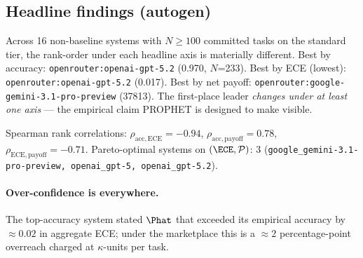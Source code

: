 \subsection*{Headline findings (autogen)}
Across 16 non-baseline systems with $N \ge 100$ committed tasks on the standard tier, the rank-order under each headline axis is materially different. Best by accuracy: \texttt{openrouter:openai-gpt-5.2} (0.970, $N$=233). Best by ECE (lowest): \texttt{openrouter:openai-gpt-5.2} (0.017). Best by net payoff: \texttt{openrouter:google-gemini-3.1-pro-preview} (37813). 
The first-place leader \emph{changes under at least one axis} --- the empirical claim PROPHET is designed to make visible.

Spearman rank correlations: $\rho_{\mathrm{acc, ECE}} = -0.94$, $\rho_{\mathrm{acc, payoff}} = 0.78$, $\rho_{\mathrm{ECE, payoff}} = -0.71$. Pareto-optimal systems on $(\ECE, \mathcal{P})$: 3 (\texttt{google_gemini-3.1-pro-preview, openai_gpt-5, openai_gpt-5.2}).

\paragraph{Over-confidence is everywhere.} The top-accuracy system stated $\Phat$ that exceeded its empirical accuracy by $\approx 0.02$ in aggregate ECE; under the marketplace this is a $\approx 2$ percentage-point overreach charged at $\kappa$-units per task.